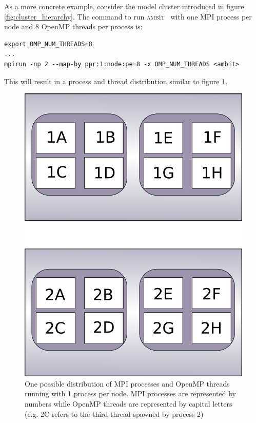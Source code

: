 \documentclass{report}
\newcommand{\ambit}{\textsc{amb}{\footnotesize i}\textsc{t}}
\begin{document}
As a more concrete example, 
consider the model cluster introduced in figure \ref{fig:cluster_hierarchy}. The command to run \ambit ~
with one MPI process per node and 8 OpenMP threads per process is:

\begin{verbatim}
export OMP_NUM_THREADS=8
...
mpirun -np 2 --map-by ppr:1:node:pe=8 -x OMP_NUM_THREADS <ambit>
\end{verbatim}

This will result in a process and thread distribution similar to figure \ref{fig:hybrid_per_node}.

\begin{figure}
\includegraphics[height=0.5\textheight]{hybrid_map_by_node.pdf}
\caption{One possible distribution of MPI processes and OpenMP threads running with 1 process per node.
MPI processes are represented by numbers while OpenMP threads are represented by capital letters 
(e.g. 2C refers to the third thread spawned by process 2)}
\label{fig:hybrid_per_node}
\end{figure}
\end{document}
